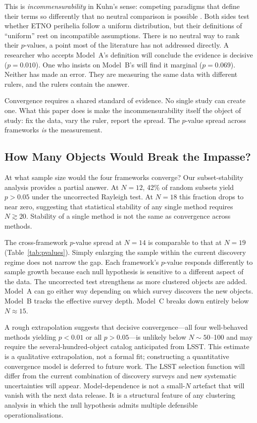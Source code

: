 \documentclass[usenatbib]{mnras}
\begin{document}
This is \textit{incommensurability} in Kuhn's sense: competing paradigms that define their terms so differently that no neutral comparison is possible \cite{kuhn1962}. Both sides test whether ETNO perihelia follow a uniform distribution, but their definitions of ``uniform'' rest on incompatible assumptions. There is no neutral way to rank their $p$-values, a point most of the literature has not addressed directly. A researcher who accepts Model~A's definition will conclude the evidence is decisive ($p=0.010$). One who insists on Model~B's will find it marginal ($p=0.069$). Neither has made an error. They are measuring the same data with different rulers, and the rulers contain the answer.

Convergence requires a shared standard of evidence. No single study can create one. What this paper does is make the incommensurability itself the object of study: fix the data, vary the ruler, report the spread. The $p$-value spread across frameworks \textit{is} the measurement.

\subsection{How Many Objects Would Break the Impasse?}

At what sample size would the four frameworks converge? Our subset-stability analysis provides a partial answer. At $N=12$, 42\% of random subsets yield $p>0.05$ under the uncorrected Rayleigh test. At $N=18$ this fraction drops to near zero, suggesting that statistical stability of any single method requires $N\gtrsim20$. Stability of a single method is not the same as convergence across methods.

The cross-framework $p$-value spread at $N=14$ is comparable to that at $N=19$ (Table~\ref{tab:pvalues}). Simply enlarging the sample within the current discovery regime does not narrow the gap. Each framework's $p$-value responds differently to sample growth because each null hypothesis is sensitive to a different aspect of the data. The uncorrected test strengthens as more clustered objects are added. Model~A can go either way depending on which survey discovers the new objects. Model~B tracks the effective survey depth. Model~C breaks down entirely below $N\approx15$.


A rough extrapolation suggests that decisive convergence---all four well-behaved methods yielding $p<0.01$ or all $p>0.05$---is unlikely below $N\sim50$--100 and may require the several-hundred-object catalog anticipated from LSST. This estimate is a qualitative extrapolation, not a formal fit; constructing a quantitative convergence model is deferred to future work. The LSST selection function will differ from the current combination of discovery surveys and new systematic uncertainties will appear. Model-dependence is not a small-$N$ artefact that will vanish with the next data release. It is a structural feature of any clustering analysis in which the null hypothesis admits multiple defensible operationalisations.
\end{document}
